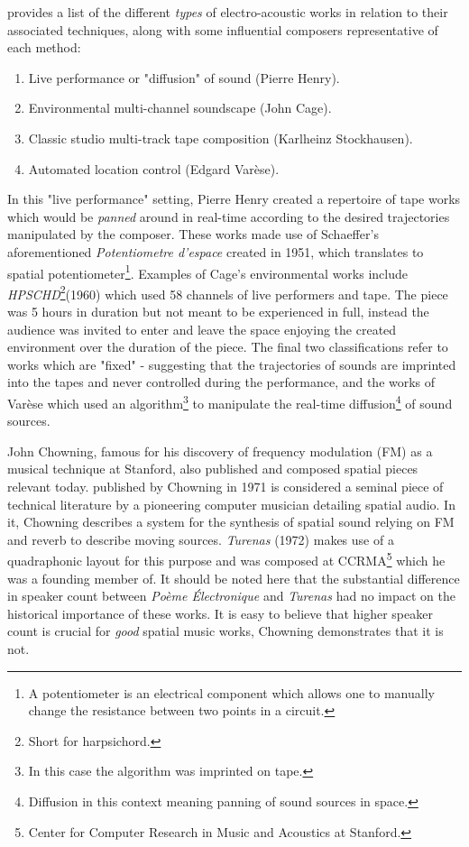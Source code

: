 \cite{zvonar2000extremely} provides a list of the different \textit{types} of electro-acoustic works in relation to their associated techniques, along with some influential composers representative of each method:

\begin{enumerate}
    \item Live performance or "diffusion" of sound (Pierre Henry).
    \item Environmental multi-channel soundscape (John Cage).
    \item Classic studio multi-track tape composition (Karlheinz Stockhausen).
    \item Automated location control (Edgard Varèse).
\end{enumerate}

In this "live performance" setting, Pierre Henry created a repertoire of tape works which would be \textit{panned} around in real-time according to the desired trajectories manipulated by the composer. These works made use of Schaeffer's aforementioned \textit{Potentiometre d'espace} created in 1951, which translates to spatial potentiometer\footnote{A potentiometer is an electrical component which allows one to manually change the resistance between two points in a circuit.}. Examples of Cage's environmental works include \textit{HPSCHD}\footnote{Short for harpsichord.}(1960) which used 58 channels of live performers and tape. The piece was 5 hours in duration but not meant to be experienced in full, instead the audience was invited to enter and leave the space enjoying the created environment over the duration of the piece. The final two classifications refer to works which are "fixed" - suggesting that the trajectories of sounds are imprinted into the tapes and never controlled during the performance, and the works of Varèse which used an algorithm\footnote{In this case the algorithm was imprinted on tape.} to manipulate the real-time diffusion\footnote{Diffusion in this context meaning panning of sound sources in space.} of sound sources. 

John Chowning, famous for his discovery of frequency modulation (FM) as a musical technique at Stanford, also published and composed spatial pieces relevant today. \cite{chowning1971simulation} published by Chowning in 1971 is considered a seminal piece of technical literature by a pioneering computer musician detailing spatial audio. In it, Chowning describes a system for the synthesis of spatial sound relying on FM and reverb to describe moving sources. \textit{Turenas} (1972) makes use of a quadraphonic layout for this purpose and was composed at CCRMA\footnote{Center for Computer Research in Music and Acoustics at Stanford.} which he was a founding member of. It should be noted here that the substantial difference in speaker count between \textit{Poème Électronique} and \textit{Turenas} had no impact on the historical importance of these works. It is easy to believe that higher speaker count is crucial for \textit{good} spatial music works, Chowning demonstrates that it is not.

